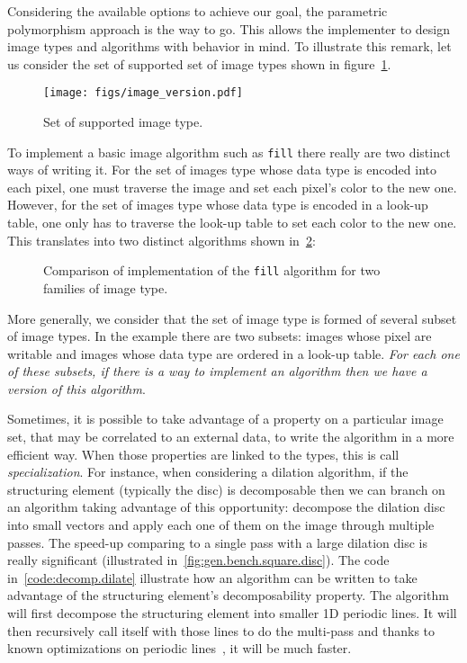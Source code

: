 Considering the available options to achieve our goal, the parametric polymorphism approach is the way to go. This
allows the implementer to design image types and algorithms with behavior in mind. To illustrate this remark, let us
consider the set of supported set of image types shown in figure~\ref{fig:image.version}.

\begin{figure}[tbh]
  \centering
  \texttt{[image: figs/image\_version.pdf]}
  \caption{Set of supported image type.}
  \label{fig:image.version}
\end{figure}

To implement a basic image algorithm such as \texttt{fill} there really are two distinct ways of writing it. For the
set of images type whose data type is encoded into each pixel, one must traverse the image and set each pixel's color
to the new one. However, for the set of images type whose data type is encoded in a look-up table, one only has to
traverse the look-up table to set each color to the new one. This translates into two distinct algorithms shown
in~\cref{fig:traverse.vs.LUT}:

\begin{figure}[tbh]
  \centering
  \hfil

  \caption{Comparison of implementation of the \texttt{fill} algorithm for two
    families of image type.}
  \label{fig:traverse.vs.LUT}
\end{figure}

More generally, we consider that the set of image type is formed of several subset of image types. In the example there
are two subsets: images whose pixel are writable and images whose data type are ordered in a look-up table. \emph{For
  each one of these subsets, if there is a way to implement an algorithm then we have a \emph{version} of this algorithm}.

Sometimes, it is possible to take advantage of a property on a particular image set, that may be correlated to an
external data, to write the algorithm in a more efficient way. When those properties are linked to the types, this is
call \emph{specialization}. For instance, when considering a dilation algorithm, if the structuring element (typically
the disc) is decomposable then we can branch on an algorithm taking advantage of this opportunity: decompose the
dilation disc into small vectors and apply each one of them on the image through multiple passes. The speed-up comparing
to a single pass with a large dilation disc is really significant (illustrated in~\ref{fig:gen.bench.square.disc}). The
code in~\ref{code:decomp.dilate} illustrate how an algorithm can be written to take advantage of the structuring
element's decomposability property. The algorithm will first decompose the structuring element into smaller 1D periodic
lines. It will then recursively call itself with those lines to do the multi-pass and thanks to known optimizations on
periodic lines~\cite{vanherk.1992.localminmax}, it will be much faster.


